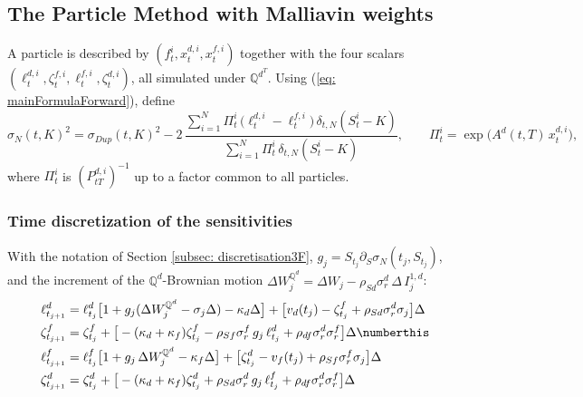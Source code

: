 \subsection{The Particle Method with Malliavin weights}
A particle is described by $(f^i_t,x^{d,i}_t,x^{f,i}_t)$ together with the four scalars $(\ell^{d,i}_t,\zeta^{f,i}_t,\ell^{f,i}_t,\zeta^{d,i}_t)$, all simulated under $\mathbb{Q}^{d^T}$. Using (\ref{eq: mainFormulaForward}), define
\begin{equation}\label{eq: particleMalliavin3F}
\sigma_N(t,K)^2=\sigma_{Dup}(t,K)^2
-2\,\frac{\sum_{i=1}^N\Pi^i_t\,\big(\ell^{d,i}_t-\ell^{f,i}_t\big)\,\delta_{t,N}(S^i_t-K)}
{\sum_{i=1}^N\Pi^i_t\,\delta_{t,N}(S^i_t-K)},\qquad \Pi^i_t=\exp\big(A^d(t,T)\,x^{d,i}_t\big),
\end{equation}
where $\Pi^i_t$ is $(P^{d,i}_{tT})^{-1}$ up to a factor common to all particles.

\subsubsection*{Time discretization of the sensitivities}
With the notation of Section \ref{subsec: discretisation3F}, $g_j=S_{t_j}\partial_S\sigma_N(t_j,S_{t_j})$, and the increment of the $\mathbb{Q}^d$-Brownian motion $\Delta W^{\mathbb{Q}^d}_j=\Delta W_j-\rho_{Sd}\sigma^d_r\,\Delta\,I^{1,d}_j$:
\begin{align*}
\ell^d_{t_{j+1}}&=\ell^d_{t_j}\big[1+g_j(\Delta W^{\mathbb{Q}^d}_j-\sigma_j\Delta)-\kappa_d\Delta\big]
+\big[v_d(t_j)-\zeta^f_{t_j}+\rho_{Sd}\sigma^d_r\sigma_j\big]\Delta\\
\zeta^f_{t_{j+1}}&=\zeta^f_{t_j}+\big[-(\kappa_d+\kappa_f)\zeta^f_{t_j}-\rho_{Sf}\sigma^f_r\,g_j\,\ell^d_{t_j}+\rho_{df}\sigma^d_r\sigma^f_r\big]\Delta \numberthis\label{eq: eulerSensitivities}\\
\ell^f_{t_{j+1}}&=\ell^f_{t_j}\big[1+g_j\,\Delta W^{\mathbb{Q}^d}_j-\kappa_f\Delta\big]
+\big[\zeta^d_{t_j}-v_f(t_j)+\rho_{Sf}\sigma^f_r\sigma_j\big]\Delta\\
\zeta^d_{t_{j+1}}&=\zeta^d_{t_j}+\big[-(\kappa_d+\kappa_f)\zeta^d_{t_j}+\rho_{Sd}\sigma^d_r\,g_j\,\ell^f_{t_j}+\rho_{df}\sigma^d_r\sigma^f_r\big]\Delta
\end{align*}

